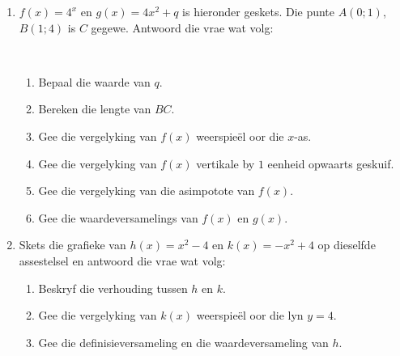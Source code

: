 \begin{eocexercises}{}
\begin{enumerate}[noitemsep, label=\textbf{\arabic*}. ]
  \item$f(x)=4^x$ en $g(x)=4x^2+q$ is hieronder geskets. Die punte $A(0;1)$, $B(1;4)$ is $C$ gegewe. Antwoord die vrae wat volg:
  \begin{center}  
\end{center}
    \\
    \begin{enumerate}[noitemsep, label=\textbf{(\alph*)} ]
    \item Bepaal die waarde van $q$.
    \item Bereken die lengte van $BC$.
    \item Gee die vergelyking van $f(x)$ weerspieël oor die $x$-as.
    \item Gee die vergelyking van $f(x)$ vertikale by $1$ eenheid opwaarts geskuif.
    \item Gee die vergelyking van die asimpotote van $f(x)$.
    \item Gee die waardeversamelings van $f(x)$ en $g(x)$.
    \end{enumerate}
    
  \item Skets die grafieke van $h(x)=x^2-4$ en $k(x)=-x^2+4$ op dieselfde assestelsel en antwoord die vrae wat volg: 
    \begin{enumerate}[noitemsep, label=\textbf{(\alph*)} ]
    \item Beskryf die verhouding tussen $h$ en $k$.
    \item Gee die vergelyking van $k(x)$ weerspieël oor die lyn $y=4$.
    \item Gee die definisieversameling en die waardeversameling van $h$.
    \end{enumerate}
    

\end{enumerate}
\end{eocexercises}
